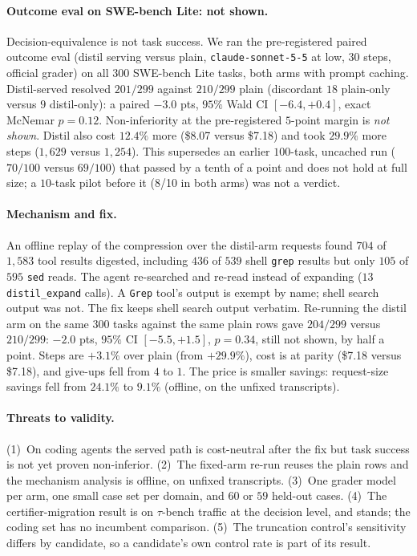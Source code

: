 \documentclass[11pt]{article}
\begin{document}
\paragraph{Outcome eval on SWE-bench Lite: not shown.} Decision-equivalence is not task success.
We ran the pre-registered paired outcome eval (distil serving versus plain,
\texttt{claude-sonnet-5-5} at low, $30$ steps, official grader) on all $300$ SWE-bench Lite
tasks, both arms with prompt caching. Distil-served resolved $201/299$ against $210/299$ plain
(discordant $18$ plain-only versus $9$ distil-only): a paired $-3.0$ pts, $95\%$ Wald CI
$[-6.4,+0.4]$, exact McNemar $p=0.12$. Non-inferiority at the pre-registered $5$-point margin is
\emph{not shown}. Distil also cost $12.4\%$ more (\$8.07 versus \$7.18) and took $29.9\%$ more
steps ($1{,}629$ versus $1{,}254$). This supersedes an earlier $100$-task, uncached run ($70/100$
versus $69/100$) that passed by a tenth of a point and does not hold at full size; a $10$-task
pilot before it (8/10 in both arms) was not a verdict.

\paragraph{Mechanism and fix.} An offline replay of the compression over the distil-arm requests
found $704$ of $1{,}583$ tool results digested, including $436$ of $539$ shell \texttt{grep}
results but only $105$ of $595$ \texttt{sed} reads. The agent re-searched and re-read instead of
expanding ($13$ \texttt{distil\_expand} calls). A \texttt{Grep} tool's output is exempt by name;
shell search output was not. The fix keeps shell search output verbatim. Re-running the distil arm
on the same $300$ tasks against the same plain rows gave $204/299$ versus $210/299$: $-2.0$ pts,
$95\%$ CI $[-5.5,+1.5]$, $p=0.34$, still not shown, by half a point. Steps are $+3.1\%$ over
plain (from $+29.9\%$), cost is at parity (\$7.18 versus \$7.18), and give-ups fell from $4$ to
$1$. The price is smaller savings: request-size savings fell from $24.1\%$ to $9.1\%$ (offline,
on the unfixed transcripts).

\paragraph{Threats to validity.} (1)~On coding agents the served path is cost-neutral after the
fix but task success is not yet proven non-inferior. (2)~The fixed-arm re-run reuses the plain rows
and the mechanism analysis is offline, on unfixed transcripts. (3)~One grader model per arm, one
small case set per domain, and $60$ or $59$ held-out cases. (4)~The certifier-migration result is
on $\tau$-bench traffic at the decision level, and stands; the coding set has no incumbent
comparison. (5)~The truncation control's sensitivity differs by candidate, so a candidate's own
control rate is part of its result.
\end{document}
